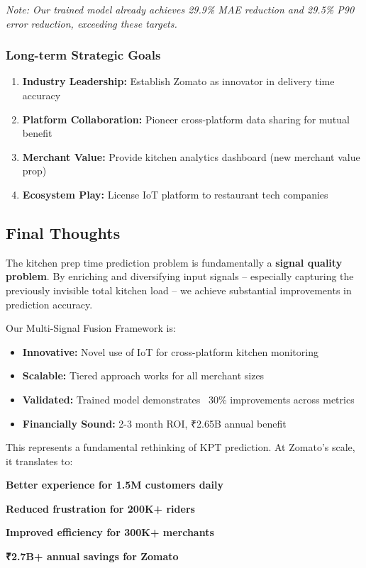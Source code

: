 \documentclass[11pt,a4paper]{article}
\begin{document}
\textit{Note: Our trained model already achieves 29.9\% MAE reduction and 29.5\% P90 error reduction, exceeding these targets.}

\subsubsection{Long-term Strategic Goals}

\begin{enumerate}[leftmargin=*]
    \item \textbf{Industry Leadership:} Establish Zomato as innovator in delivery time accuracy
    \item \textbf{Platform Collaboration:} Pioneer cross-platform data sharing for mutual benefit
    \item \textbf{Merchant Value:} Provide kitchen analytics dashboard (new merchant value prop)
    \item \textbf{Ecosystem Play:} License IoT platform to restaurant tech companies
\end{enumerate}

\subsection{Final Thoughts}

The kitchen prep time prediction problem is fundamentally a \textbf{signal quality problem}. By enriching and diversifying input signals -- especially capturing the previously invisible total kitchen load -- we achieve substantial improvements in prediction accuracy.

Our Multi-Signal Fusion Framework is:
\begin{itemize}
    \item \textbf{Innovative:} Novel use of IoT for cross-platform kitchen monitoring
    \item \textbf{Scalable:} Tiered approach works for all merchant sizes
    \item \textbf{Validated:} Trained model demonstrates ~30\% improvements across metrics
    \item \textbf{Financially Sound:} 2-3 month ROI, ₹2.65B annual benefit
\end{itemize}

This represents a fundamental rethinking of KPT prediction. At Zomato's scale, it translates to:

\begin{center}
\Large
\textbf{Better experience for 1.5M customers daily}

\textbf{Reduced frustration for 200K+ riders}

\textbf{Improved efficiency for 300K+ merchants}

\textbf{₹2.7B+ annual savings for Zomato}
\end{center}
\end{document}
